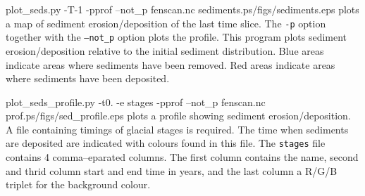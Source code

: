 \begin{pycf}{plot\_seds.py -T-1 -pprof --not\_p  fenscan.nc sediments.ps}{\dir/figs/sediments.eps}
plots a map of sediment erosion/deposition of the last time slice. The \texttt{-p} option together with the \texttt{--not\_p} option plots the profile. This program plots sediment erosion/deposition relative to the initial sediment distribution. Blue areas indicate areas where sediments have been removed. Red areas indicate areas where sediments have been deposited.
\end{pycf}

\begin{pycf}{plot\_seds\_profile.py -t0. -e stages -pprof --not\_p fenscan.nc prof.ps}{\dir/figs/sed_profile.eps}
plots a profile showing sediment erosion/deposition. A file containing timings of glacial stages is required. The time when sediments are deposited are indicated with colours found in this file. The \texttt{stages} file contains 4 comma--eparated columns. The first column contains the name, second and thrid column start and end time in years, and the last column a R/G/B triplet for the background colour.
\end{pycf}
